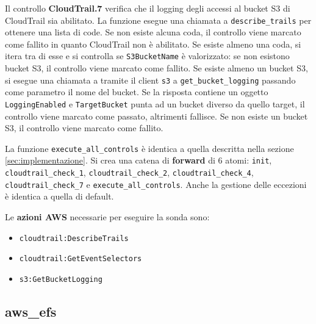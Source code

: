 Il controllo \textbf{CloudTrail.7} verifica che il logging degli accessi al bucket S3 di CloudTrail sia abilitato. La funzione esegue una chiamata a \texttt{describe\_trails} per ottenere una lista di code. Se non esiste alcuna coda, il controllo viene marcato come fallito in quanto CloudTrail non è abilitato. Se esiste almeno una coda, si itera tra di esse e si controlla se \texttt{S3BucketName} è valorizzato: se non esistono bucket S3, il controllo viene marcato come fallito. Se esiste almeno un bucket S3, si esegue una chiamata a tramite il client \texttt{s3} a \texttt{get\_bucket\_logging} passando come parametro il nome del bucket. Se la risposta contiene un oggetto \texttt{LoggingEnabled} e \texttt{TargetBucket} punta ad un bucket diverso da quello target, il controllo viene marcato come passato, altrimenti fallisce. Se non esiste un bucket S3, il controllo viene marcato come fallito.

La funzione \texttt{execute\_all\_controls} è identica a quella descritta nella sezione \ref{sec:implementazione}. Si crea una catena di \textbf{forward} di 6 atomi: \texttt{init}, \texttt{cloudtrail\_check\_1}, \texttt{cloudtrail\_check\_2}, \texttt{cloudtrail\_check\_4}, \texttt{cloudtrail\_check\_7} e \texttt{execute\_all\_controls}. Anche la gestione delle eccezioni è identica a quella di default.

Le \textbf{azioni AWS} necessarie per eseguire la sonda sono:
\begin{itemize}
    \item \texttt{cloudtrail:DescribeTrails}
    \item \texttt{cloudtrail:GetEventSelectors}
    \item \texttt{s3:GetBucketLogging}
\end{itemize}

\subsection{aws\_efs}
\label{sec:efs}

